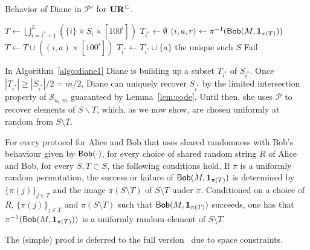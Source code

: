 \begin{algorithm}[H] 
  \caption{Behavior of Diane in $\mathcal P'$ for $\mathbf{UR}^\subset$.} \label{algo:diane1}
  \begin{algorithmic}[1]
    \State $T \leftarrow \bigcup_{i=i^*+1}^L (\{i\} \times S_i \times [100^i])$
    \State $T_{i^*}\leftarrow \emptyset$
      \State $(i,a,r)\leftarrow \pi^{-1}(\mathsf{Bob}(M, \mathbf{1}_{\pi(T)}))$
      \State $T\leftarrow T \cup ((i,a) \times [100^i])$
        \State $T_{i^*} \leftarrow T_{i^*}\cup \{a\}$
      \EndIf
    \EndWhile
      \State \Return the unique such $S$
    \Else
      \State \Return \textsf{Fail}
    \EndIf
    \EndProcedure
  \end{algorithmic}
\end{algorithm}

In Algorithm~\ref{algo:diane1} Diane is building up a subset $T_{i^*}$ of $S_{i^*}$. Once $|T_{i^*}| \ge |S_{i^*}|/2 = m/2$, Diane can uniquely recover $S_{i^*}$ by the limited intersection property of $\mathcal{S}_{u_i,m}$ guaranteed by Lemma~\ref{lem:code}. Until then, she uses $\mathcal P$ to recover elements of $S\backslash T$, which, as we now show, are chosen uniformly at random from $S\setminus T$. 

\begin{claim}\label{cl:uniform}
For every protocol for Alice and Bob that uses shared randomness with Bob's behaviour given by $\mathsf{Bob}(\cdot)$, for every choice of shared random string $R$ of Alice and Bob, for every $S, T\subset S$, the following conditions hold. If $\pi$ is a uniformly random permutation, the success or failure of $\mathsf{Bob}(M, \mathbf{1}_{\pi(T)})$ is determined by $\{\pi(j)\}_{j\in T}$ and the image $\pi(S\setminus T)$ of $S\setminus T$ under $\pi$. Conditioned on a choice of $R$, $\{\pi(j)\}_{j\in T}$ and $\pi(S\setminus T)$ such that $\mathsf{Bob}(M, \mathbf{1}_{\pi(T)})$ succeeds, one has that $\pi^{-1}(\mathsf{Bob}(M, \mathbf{1}_{\pi(T)}))$ is a uniformly random element of $S\setminus T$.
\end{claim}
The (simple) proof is deferred to the full version~\cite{KapralovNPWWY17} due to space constraints.

